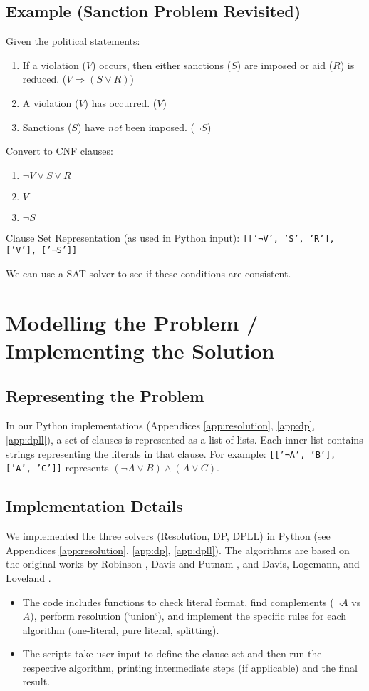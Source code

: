 \documentclass[11pt, a4paper]{article}
\begin{document}
\subsection*{Example (Sanction Problem Revisited)}
Given the political statements:
\begin{enumerate}
    \item If a violation ($V$) occurs, then either sanctions ($S$) are imposed or aid ($R$) is reduced. ($V \Rightarrow (S \vee R)$)
    \item A violation ($V$) has occurred. ($V$)
    \item Sanctions ($S$) have \textit{not} been imposed. ($\neg S$)
\end{enumerate}

Convert to CNF clauses:
\begin{enumerate}
    \item $\neg V \vee S \vee R$
    \item $V$
    \item $\neg S$
\end{enumerate}

Clause Set Representation (as used in Python input): \texttt{[['¬V', 'S', 'R'], ['V'], ['¬S']]}

We can use a SAT solver to see if these conditions are consistent.

\section{Modelling the Problem / Implementing the Solution} \label{sec:implementation}

\subsection*{Representing the Problem}
In our Python implementations (Appendices \ref{app:resolution}, \ref{app:dp}, \ref{app:dpll}), a set of clauses is represented as a list of lists. Each inner list contains strings representing the literals in that clause. For example: \texttt{[['¬A', 'B'], ['A', 'C']]} represents $(\neg A \vee B) \wedge (A \vee C)$.

\subsection*{Implementation Details}
We implemented the three solvers (Resolution, DP, DPLL) in Python (see Appendices \ref{app:resolution}, \ref{app:dp}, \ref{app:dpll}). The algorithms are based on the original works by Robinson \cite{Robinson1965}, Davis and Putnam \cite{DavisPutnam1960}, and Davis, Logemann, and Loveland \cite{DPLL1962}.
\begin{itemize}
    \item The code includes functions to check literal format, find complements ($\neg A$ vs $A$), perform resolution (`union`), and implement the specific rules for each algorithm (one-literal, pure literal, splitting).
    \item The scripts take user input to define the clause set and then run the respective algorithm, printing intermediate steps (if applicable) and the final result.
\end{itemize}
\end{document}
